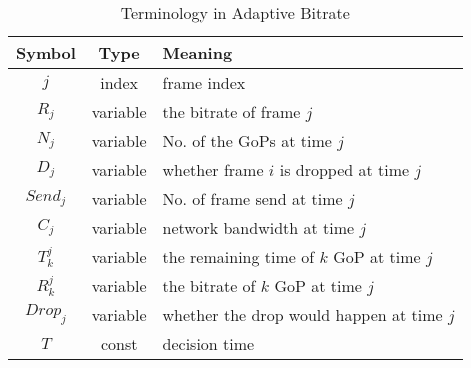 \begin{table}[tb]
\centering
\caption{Terminology in Adaptive Bitrate}
\label{tbl:vbrval}
{\setlength{\tabcolsep}{1pt}
\begin{tabular}{|c|c|l|}
\hline
\textbf{Symbol} & \textbf{Type} & \textbf{Meaning}                      \\ \hline
$j$               & index         & frame index                            \\ \hline
$R_j$             & variable      & the bitrate of frame $j$ \\ \hline
$N_j$             & variable      & No. of the GoPs at time $j$     \\ \hline
$D_j$             & variable      & whether frame $i$ is dropped at time $j$  \\ \hline
$Send_j$             & variable   & No. of frame send at time $j$ \\ \hline
$C_j$              & variable         & network bandwidth at time $j$           \\ \hline
$T_k^j$               & variable         &the remaining time of $k$ GoP at time $j$  \\ \hline
$R_k^j$            & variable         & the bitrate of $k$ GoP at time $j$  \\ \hline
$Drop_j$       & variable & whether the drop would happen at time $j$ \\ \hline
$T$               & const         & decision time                        \\ \hline\end{tabular}}
\end{table}
